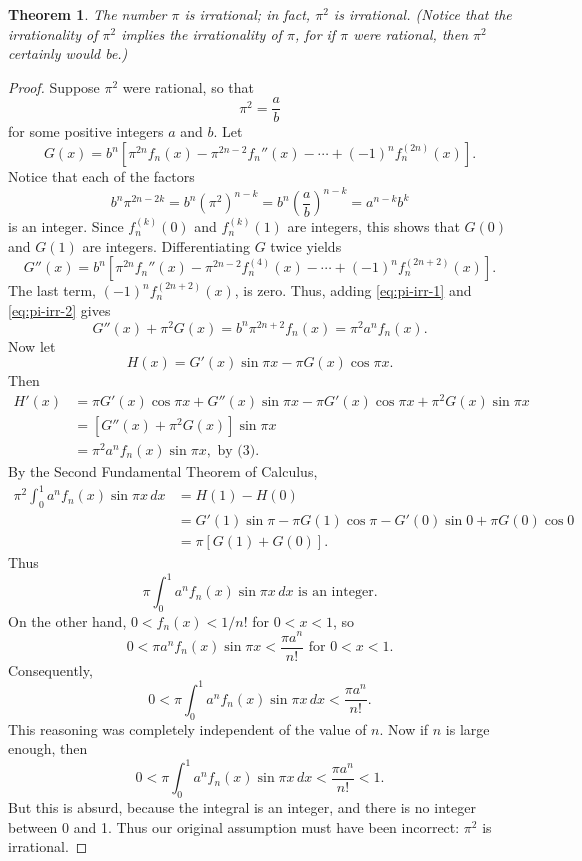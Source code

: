 \documentclass{article}
\newtheorem{theorem}{Theorem}
\begin{document}
\begin{theorem}
  The number $\pi$ is irrational; in fact, $\pi^2$ is irrational. (Notice that
  the irrationality of $\pi^2$ implies the irrationality of $\pi$, for if $\pi$
  were rational, then $\pi^2$ certainly would be.)
\end{theorem}
\begin{proof}
  Suppose $\pi^2$ were rational, so that \[
    \pi^2 = \frac{a}{b}
  \] for some positive integers $a$ and $b$. Let
  \begin{equation} \label{eq:pi-irr-1}
    G(x) = b^n[
      \pi^{2n}f_n(x) - \pi^{2n - 2}f_n''(x) - \cdots + (-1)^nf_n^{(2n)}(x)
    ].
  \end{equation}
  Notice that each of the factors \[
    b^n \pi^{2n - 2k}
    = b^n (\pi^2)^{n-k}
    = b^n \left( \frac{a}{b} \right)^{n-k}
    = a^{n-k} b^k
  \] is an integer. Since $f_n^{(k)}(0)$ and $f_n^{(k)}(1)$ are integers, this
  shows that $G(0)$ and $G(1)$ are integers. Differentiating $G$ twice yields
  \begin{equation} \label{eq:pi-irr-2}
    G''(x) = b^n[
      \pi^{2n}f_n''(x) - \pi^{2n-2}f_n^{(4)}(x) - \cdots +
      (-1)^nf_n^{(2n+2)}(x)
    ].
  \end{equation}
  The last term, $(-1)^nf_n^{(2n + 2)}(x)$, is zero. Thus, adding
  \eqref{eq:pi-irr-1} and \eqref{eq:pi-irr-2} gives
  \begin{equation}
    G''(x) + \pi^2 G(x) = b^n \pi^{2n + 2} f_n(x) = \pi^2 a^n f_n(x).
  \end{equation}
  Now let \[
    H(x) = G'(x) \sin \pi x - \pi G(x) \cos \pi x.
  \] Then
  \begin{align*}
    H'(x)
    &= \pi G'(x) \cos \pi x + G''(x) \sin \pi x - \pi G'(x) \cos \pi x + \pi^2
    G(x)\sin\pi x \\
    &= [G''(x) + \pi^2 G(x)] \sin \pi x \\
    &= \pi^2 a^n f_n(x) \sin \pi x, \text{ by (3)}.
  \end{align*}
  By the Second Fundamental Theorem of Calculus,
  \begin{align*}
    \pi^2 \int_0^1 a^n f_n(x) \sin \pi x \,dx
    &= H(1) - H(0) \\
    &= G'(1) \sin \pi - \pi G(1) \cos \pi - G'(0) \sin 0 + \pi G(0) \cos 0 \\
    &= \pi[G(1) + G(0)].
  \end{align*} Thus \[
    \pi \int_0^1 a^n f_n(x) \sin \pi x \,dx \text{ is an integer}.
  \] On the other hand, $0 < f_n(x) < 1/n!$ for $0 < x < 1$, so \[
    0 < \pi a^n f_n(x) \sin \pi x < \frac{\pi a^n}{n!} \text{ for } 0 < x < 1.
  \] Consequently, \[
    0 < \pi \int_0^1 a^n f_n(x) \sin \pi x \,dx < \frac{\pi a^n}{n!}.
  \] This reasoning was completely independent of the value of $n$. Now if $n$
  is large enough, then \[
    0 < \pi \int_0^1 a^n f_n(x) \sin \pi x \,dx < \frac{\pi a^n}{n!} < 1.
  \] But this is absurd, because the integral is an integer, and there is no
  integer between 0 and 1. Thus our original assumption must have been
  incorrect: $\pi^2$ is irrational.
\end{proof}
\end{document}
